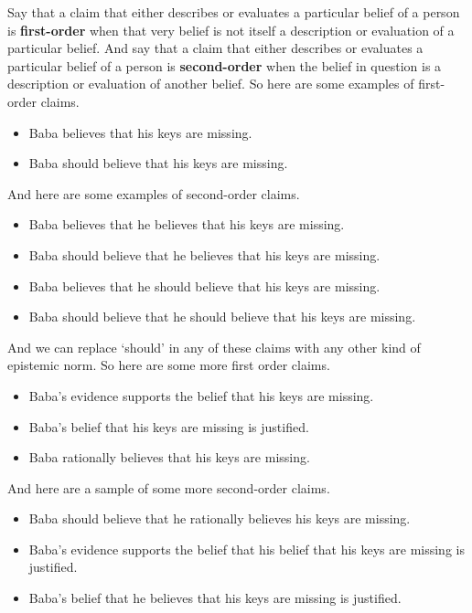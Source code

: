 \documentclass[
  10pt,
  letterpaper,
  twoside]{scrbook}
\providecommand{\tightlist}{%
  \setlength{\itemsep}{0pt}\setlength{\parskip}{0pt}}\usepackage{longtable,booktabs,array}
\begin{document}
Say that a claim that either describes or evaluates a particular belief
of a person is \textbf{first-order} when that very belief is not itself
a description or evaluation of a particular belief. And say that a claim
that either describes or evaluates a particular belief of a person is
\textbf{second-order} when the belief in question is a description or
evaluation of another belief. So here are some examples of first-order
claims.

\begin{itemize}
\tightlist
\item
  {Baba} believes that his keys are missing.
\item
  {Baba} should believe that his keys are missing.
\end{itemize}

And here are some examples of second-order claims.

\begin{itemize}
\tightlist
\item
  {Baba} believes that he believes that his keys are missing.
\item
  {Baba} should believe that he believes that his keys are missing.
\item
  {Baba} believes that he should believe that his keys are missing.
\item
  {Baba} should believe that he should believe that his keys are
  missing.
\end{itemize}

And we can replace `should' in any of these claims with any other kind
of epistemic norm. So here are some more first order claims.

\begin{itemize}
\tightlist
\item
  {Baba}'s evidence supports the belief that his keys are missing.
\item
  {Baba}'s belief that his keys are missing is justified.
\item
  {Baba} rationally believes that his keys are missing.
\end{itemize}

And here are a sample of some more second-order claims.

\begin{itemize}
\tightlist
\item
  {Baba} should believe that he rationally believes his keys are
  missing.
\item
  {Baba}'s evidence supports the belief that his belief that his keys
  are missing is justified.
\item
  {Baba}'s belief that he believes that his keys are missing is
  justified.
\end{itemize}
\end{document}
